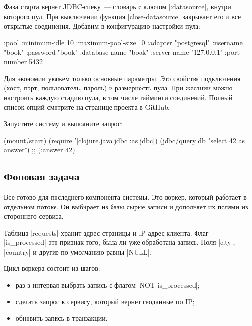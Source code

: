 Фаза старта вернет JDBC-спеку~--- словарь с ключом \spverb|:datasource|, внутри
которого пул. При выключении функция \spverb|close-datasource| закрывает его и
все открытые соединения. Добавим в конфигурацию настройки пула:

\begin{english}
  \begin{clojure}
{:pool {:minimum-idle       10
        :maximum-pool-size  10
        :adapter            "postgresql"
        :username           "book"
        :password           "book"
        :database-name      "book"
        :server-name        "127.0.0.1"
        :port-number        5432}}
  \end{clojure}
\end{english}

Для экономии укажем только основные параметры. Это свойства подключения (хост,
порт, пользователь, пароль) и размерность пула. При желании можно настроить
каждую стадию пула, в том числе тайминги соединений. Полный список опций
смотрите на странице проекта в GitHub.

Запустите систему и выполните запрос:

\begin{english}
  \begin{clojure}
(mount/start)
(require '[clojure.java.jdbc :as jdbc])
(jdbc/query db "select 42 as answer")
;; ({:answer 42})
  \end{clojure}
\end{english}

\subsection{Фоновая задача}

Все готово для последнего компонента системы. Это воркер, который работает в
отдельном потоке. Он выбирает из базы сырые записи и дополняет их полями из
стороннего сервиса.

Таблица \spverb|requests| хранит адрес страницы и IP-адрес клиента. Флаг
\spverb|is_processed| это признак того, была ли уже обработана запись. Поля
\spverb|city|, \spverb|country| и другие по умолчанию равны \spverb|NULL|.

Цикл воркера состоит из шагов:

\begin{itemize}

\item
  раз в интервал выбрать запись с флагом \spverb|NOT is_processed|;

\item
  сделать запрос к сервису, который вернет геоданные по IP;

\item
  обновить запись в транзакции.

\end{itemize}

